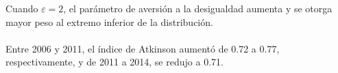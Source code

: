Cuando $\varepsilon = \mbox{2}$, el parámetro de aversión a la desigualdad aumenta y se otorga mayor peso al extremo inferior de la distribución. \\\\ Entre 2006 y 2011, el índice de Atkinson aumentó de 0.72 a 0.77, respectivamente, y de 2011 a 2014, se redujo a 0.71.  
